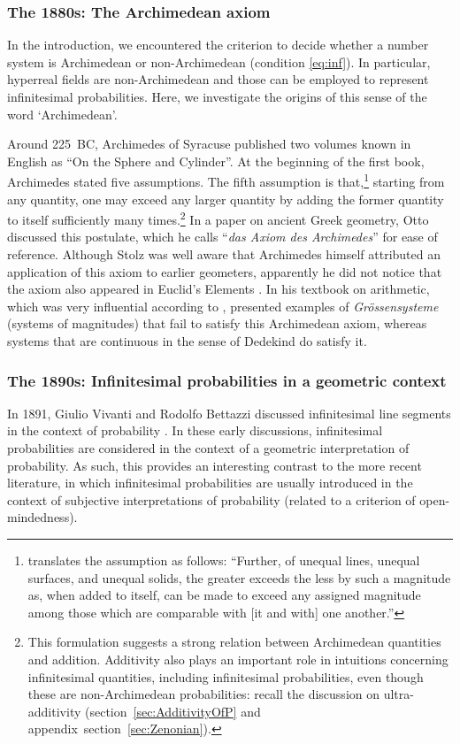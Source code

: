 \subsubsection*{The 1880s: The Archimedean axiom}
In the introduction, we encountered the criterion to decide whether a number system is Archimedean or non-Archimedean (condition \ref{eq:inf}).
In particular, hyperreal fields are non-Archimedean and those can be employed to represent infinitesimal probabilities.
Here, we investigate the origins of this sense of the word `Archimedean'.

Around 225~BC, Archimedes of Syracuse published two volumes known in English as ``On the Sphere and Cylinder''. At the beginning of the first book, Archimedes stated five assumptions. The fifth assumption is that,\footnote{\citet[p.~4]{Heath:1897} translates the assumption as follows: ``Further, of unequal lines, unequal surfaces, and unequal solids, the greater exceeds the less by such a magnitude as, when added to itself, can be made to exceed any assigned magnitude among those which are comparable with [it and with] one another.''} starting from any quantity, one may exceed any larger quantity by adding the former quantity to itself sufficiently many times.\footnote{This formulation suggests a strong relation between Archimedean quantities and addition. Additivity also plays an important role in intuitions concerning infinitesimal quantities, including infinitesimal probabilities, even though these are non-Archimedean probabilities: recall the discussion on ultra-additivity (section~\ref{sec:AdditivityOfP} and appendix~section~\ref{sec:Zenonian}).}
In a paper on ancient Greek geometry, Otto \citet{Stolz:1883} discussed this postulate, which he calls ``\textit{das Axiom des Archimedes}'' for ease of reference. Although Stolz was well aware that Archimedes himself attributed an application of this axiom to earlier geometers, apparently he did not notice that the axiom also appeared in Euclid's Elements \citep[p.~888]{Bair-etal:2013}.
In his textbook on arithmetic, which was very influential according to \citet[p.~5]{Ehrlich:2006}, \citet{Stolz:1885} presented examples of \textit{Gr{\"o}ssensysteme} (systems of magnitudes) that fail to satisfy this Archimedean axiom, whereas systems that are continuous in the sense of Dedekind do satisfy it.

\subsubsection*{The 1890s: Infinitesimal probabilities in a geometric context}
In 1891, Giulio Vivanti and Rodolfo Bettazzi discussed infinitesimal line segments in the context of probability \citep[see][]{Ehrlich:2006}.
In these early discussions, infinitesimal probabilities are considered in the context of a geometric interpretation of probability. As such, this provides an interesting contrast to the more recent literature, in which infinitesimal probabilities are usually introduced in the context of subjective interpretations of probability (related to a criterion of open-mindedness).

